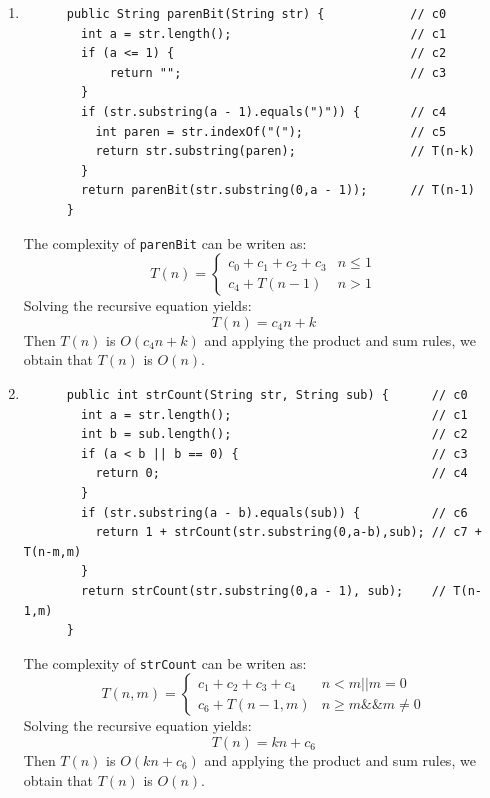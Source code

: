 \documentclass[a4paper,12pt]{article}
\begin{document}
\begin{enumerate}
      \item \begin{Verbatim}
      public String parenBit(String str) {            // c0
        int a = str.length();                         // c1
        if (a <= 1) {                                 // c2
            return "";                                // c3
        }
        if (str.substring(a - 1).equals(")")) {       // c4
          int paren = str.indexOf("(");               // c5
          return str.substring(paren);                // T(n-k)
        }
        return parenBit(str.substring(0,a - 1));      // T(n-1)
      }
      \end{Verbatim}
      The complexity of \texttt{parenBit} can be writen as:
      \begin{equation*}
        T\left( n \right)=\left\{\begin{array}{cc} c_{0}+c_{1}+c_{2}+c_{3} & n\leq 1 \\ c_{4}+T\left( n-1 \right) & n>1\end{array}\right.
      \end{equation*}
      Solving the recursive equation yields:
      \begin{equation*}
        T(n)=c_4n+k
      \end{equation*}
      Then $T(n)$ is $O(c_4n+k)$ and applying the product and sum rules, we obtain that $T(n)$ is $O(n)$.
      \item \begin{Verbatim}
      public int strCount(String str, String sub) {      // c0
        int a = str.length();                            // c1
        int b = sub.length();                            // c2
        if (a < b || b == 0) {                           // c3
          return 0;                                      // c4
        }
        if (str.substring(a - b).equals(sub)) {          // c6
          return 1 + strCount(str.substring(0,a-b),sub); // c7 + T(n-m,m)
        }
        return strCount(str.substring(0,a - 1), sub);    // T(n-1,m)
      }
      \end{Verbatim}
      The complexity of \texttt{strCount} can be writen as:
      \begin{equation*}
        T\left( n,m \right)=\left\{\begin{array}{cc} c_{1}+c_{2}+c_{3}+c_{4} & n<m || m=0 \\ c_{6}+T\left( n-1,m \right) & n\geq m \&\& m\neq 0\end{array}\right.
      \end{equation*}
      Solving the recursive equation yields:
      \begin{equation*}
        T(n)=kn+c_6
      \end{equation*}
      Then $T(n)$ is $O(kn+c_6)$ and applying the product and sum rules, we obtain that $T(n)$ is $O(n)$.
    \end{enumerate}
\end{document}

